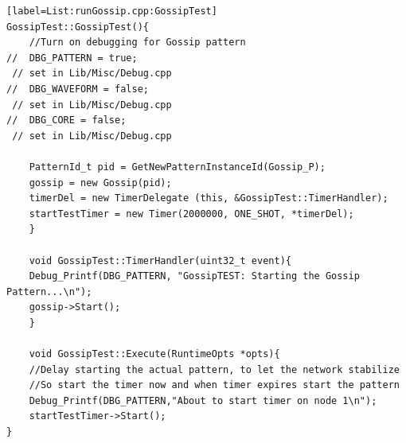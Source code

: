 \begin{lstlisting}[style=boralargefile] [label=List:runGossip.cpp:GossipTest]
GossipTest::GossipTest(){
	//Turn on debugging for Gossip pattern
// 	DBG_PATTERN = true;
 // set in Lib/Misc/Debug.cpp
// 	DBG_WAVEFORM = false;
 // set in Lib/Misc/Debug.cpp
// 	DBG_CORE = false;
 // set in Lib/Misc/Debug.cpp
	
	PatternId_t pid = GetNewPatternInstanceId(Gossip_P);
	gossip = new Gossip(pid);
	timerDel = new TimerDelegate (this, &GossipTest::TimerHandler);
	startTestTimer = new Timer(2000000, ONE_SHOT, *timerDel);
	}
	
	void GossipTest::TimerHandler(uint32_t event){
	Debug_Printf(DBG_PATTERN, "GossipTEST: Starting the Gossip Pattern...\n");
	gossip->Start();
	}
	
	void GossipTest::Execute(RuntimeOpts *opts){
	//Delay starting the actual pattern, to let the network stabilize
	//So start the timer now and when timer expires start the pattern
	Debug_Printf(DBG_PATTERN,"About to start timer on node 1\n");
	startTestTimer->Start();
}
\end{lstlisting}




